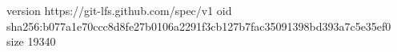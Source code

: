 version https://git-lfs.github.com/spec/v1
oid sha256:b077a1e70ccc8d8fe27b0106a2291f3cb127b7fac35091398bd393a7c5e35ef0
size 19340
